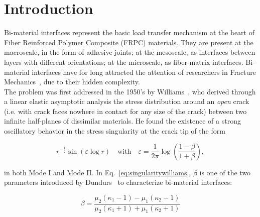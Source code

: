 \documentclass[review]{elsarticle}
\begin{document}
\linenumbers

\section{Introduction}\label{sec:intro}

Bi-material interfaces represent the basic load transfer mechanism at the heart of Fiber Reinforced Polymer Composite (FRPC) materials. They are present at the macroscale, in the form of adhesive joints; at the mesoscale, as interfaces between layers with different orientations; at the microscale, as fiber-matrix interfaces. Bi-material interfaces have for long attracted the attention of researchers in Fracture Mechanics~\cite{Comninou1990,Hills1993}, due to their hidden complexity.\\
The problem was first addressed in the 1950's by Williams~\cite{Williams1959}, who derived through a linear elastic asymptotic analysis the stress distribution around an \emph{open} crack (i.e. with crack faces nowhere in contact for any size of the crack) between two infinite half-planes of dissimilar materials. He found the existence of a strong oscillatory behavior in the stress singularity at the crack tip of the form 

\begin{equation}\label{eq:singularitywilliams}
r^{-\frac{1}{2}}\sin\left(\varepsilon\log r\right)\quad\text{with}\quad\varepsilon=\frac{1}{2\pi}\log\left(\frac{1-\beta}{1+\beta}\right),
\end{equation}

in both Mode I and Mode II. In Eq.~\ref{eq:singularitywilliams}, $\beta$ is one of the two parameters introduced by Dundurs~\cite{Dundurs1969} to characterize bi-material interfaces:

\begin{equation}\label{eq:dundursbeta}
\beta=\frac{\mu_{2}\left(\kappa_{1}-1\right)-\mu_{1}\left(\kappa_{2}-1\right)}{\mu_{2}\left(\kappa_{1}+1\right)+\mu_{1}\left(\kappa_{2}+1\right)}
\end{equation}
\end{document}
